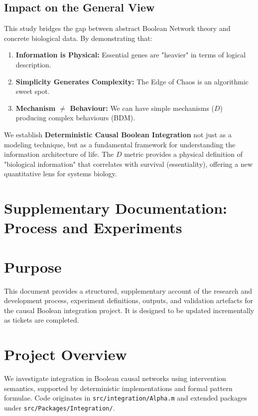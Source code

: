 \documentclass{article}
\begin{document}
\subsection{Impact on the General View}
This study bridges the gap between abstract Boolean Network theory and concrete biological data. By demonstrating that:
\begin{enumerate}
    \item \textbf{Information is Physical:} Essential genes are "heavier" in terms of logical description.
    \item \textbf{Simplicity Generates Complexity:} The Edge of Chaos is an algorithmic sweet spot.
    \item \textbf{Mechanism $\neq$ Behaviour:} We can have simple mechanisms ($D$) producing complex behaviours (BDM).
\end{enumerate}

We establish \textbf{Deterministic Causal Boolean Integration} not just as a modeling technique, but as a fundamental framework for understanding the information architecture of life. The $D$ metric provides a physical definition of "biological information" that correlates with survival (essentiality), offering a new quantitative lens for systems biology.



\section{Supplementary Documentation: Process and Experiments}


\section{Purpose}
This document provides a structured, supplementary account of the research and development process, experiment definitions, outputs, and validation artefacts for the causal Boolean integration project. It is designed to be updated incrementally as tickets are completed.
\section{Project Overview}
We investigate integration in Boolean causal networks using intervention semantics, supported by deterministic implementations and formal pattern formulae. Code originates in \texttt{src/integration/Alpha.m} and extended packages under \texttt{src/Packages/Integration/}.
\end{document}
